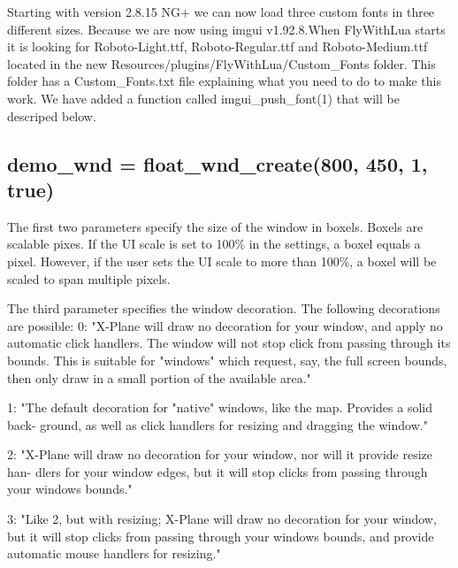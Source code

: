 \documentclass[11pt,parskip=half,a4paper]{scrartcl}
\begin{document}
Starting with version 2.8.15 NG+ we can now load three custom fonts in three different sizes. Because we are now using imgui v1.92.8.When FlyWithLua starts it is looking for Roboto-Light.ttf, Roboto-Regular.ttf and Roboto-Medium.ttf located in the new Resources/plugins/FlyWithLua/Custom\_Fonts folder. This folder has a Custom\_Fonts.txt file explaining what you need to do to make this work. We have added a function called imgui\_push\_font(1) that will be descriped below.

\subsection{demo\_wnd = float\_wnd\_create(800, 450, 1, true)}

The first two parameters specify the size of the window in boxels. Boxels are
scalable pixes. If the UI scale is set to 100\% in the settings, a boxel equals
a pixel. However, if the user sets the UI scale to more than 100\%, a boxel will
be scaled to span multiple pixels.

The third parameter specifies the window decoration. The following decorations are possible:
\hspace*{10mm}	0: "X-Plane will draw no decoration for your window, and apply no automatic click
\hspace*{10mm}	handlers. The window will not stop click from passing through its bounds. This is
\hspace*{10mm}	suitable for "windows" which request, say, the full screen bounds, then only draw in a
\hspace*{10mm}	small portion of the available area."

\hspace*{10mm}	1: "The default decoration for "native" windows, like the map. Provides a solid back-
\hspace*{10mm}	ground, as well as click handlers for resizing and dragging the window."

\hspace*{10mm}	2: "X-Plane will draw no decoration for your window, nor will it provide resize han-
\hspace*{10mm}	dlers for your window edges, but it will stop clicks from passing through your windows
\hspace*{10mm}	bounds."

\hspace*{10mm}	3: "Like 2, but with resizing; X-Plane will draw no decoration for your window, but
\hspace*{10mm}	it will stop clicks from passing through your windows bounds, and provide automatic
\hspace*{10mm}	mouse handlers for resizing."
\end{document}
